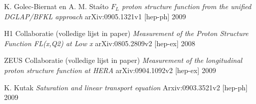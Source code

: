 \documentclass[a4paper,11pt]{article}
\numberwithin{equation}{section} %
\begin{document}
\begin{thebibliography}{99}
  K. Golec-Biernat en A. M. Staśto
  \emph{$F_L$ proton structure function from the unified DGLAP/BFKL approach}
  arXiv:0905.1321v1 [hep-ph]
  2009

  H1 Collaboratie (volledige lijst in paper)
  \emph{Measurement of the Proton Structure Function FL(x,Q2) at Low x}
  arXiv:0805.2809v2 [hep-ex]
  2008

  ZEUS Collaboratie (volledige lijst in paper)
  \emph{Measurement of the longitudinal proton structure function at HERA}
  arXiv:0904.1092v2 [hep-ex]
  2009

  K. Kutak
  \emph{Saturation and linear transport equation}
  Arxiv:0903.3521v2 [hep-ph]
  2009

\end{thebibliography}
\end{document}

